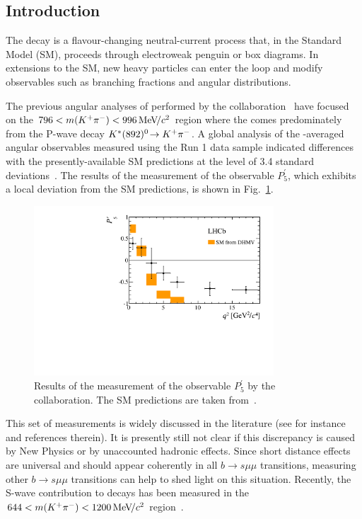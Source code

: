 \subsection{Introduction}
\label{sec:kpimm:introduction}

The decay \BdToKpimm is a flavour-changing neutral-current process that, in the Standard Model (SM), proceeds through electroweak penguin or box diagrams.  In extensions to the SM, new heavy particles can enter the loop and modify observables such as branching fractions and angular distributions.

The previous angular analyses of \BdToKpimm performed by the \lhcb collaboration~\cite{kstmm-0.3fb,kstmm-1fb,kstmm-1fb-pprime,kstmm-3fb} have focused on the $796<m({{K}^+}{{\pi}^-})<996{\mathrm{\,Me\kern -0.1em V\!/}c^2}$ region where the \kpi comes predominately from the P-wave decay ${{K}^*}(892)^{0}\!\rightarrow {\ensuremath{{K}^+}}{\ensuremath{{\pi}^-}}$. 
A global analysis of the \CP-averaged angular observables measured using the \lhcb Run 1 data sample indicated differences with the presently-available SM predictions at the level of 3.4 standard deviations~\cite{kstmm-3fb}. The results of the measurement of the observable $P_{5}^{'}$, which exhibits a local deviation from the SM predictions, is shown in Fig.~\ref{fig:kpimm:p5prime}.

\begin{figure}[!b]
\centering
\includegraphics[width=0.8\textwidth]{figs/kpimm/introduction/P5prime.pdf}
\caption{Results of the measurement of the observable $P_{5}^{'}$ by the \lhcb collaboration. The SM predictions are taken from~\cite{pprime-theory}.}
\label{fig:kpimm:p5prime}
\end{figure}

This set of measurements is widely discussed in the literature (see for instance \cite{DescotesGenon:2013wba,Beaujean:2013soa,Crivellin:2015mga,Lyon:2014hpa} and references therein). It is presently still not clear if this discrepancy is caused by New Physics or by unaccounted hadronic effects. 
Since short distance effects are universal and should appear coherently in all $b\to s \mu\mu$ transitions, measuring other $b\to s\mu\mu$ transitions can help to shed light on this situation. Recently, the S-wave contribution to \BdToKpimm decays has been measured in the $644<m({{K}^+}{{\pi}^-})<1200{\mathrm{\,Me\kern -0.1em V\!/}c^2}$ region~\cite{s-wave}. 

